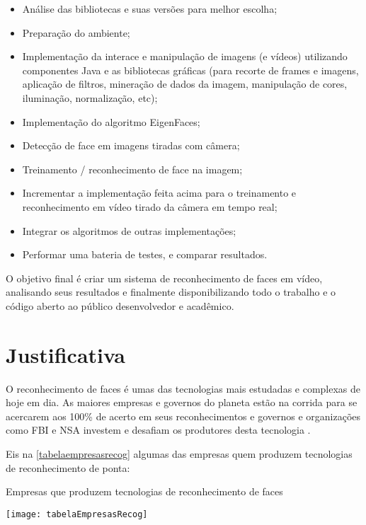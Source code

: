 \begin{itemize}
	\item Análise das bibliotecas e suas versões para melhor escolha;
	\item Preparação do ambiente;
	\item Implementação da interace e manipulação de imagens (e vídeos)  utilizando componentes Java e as bibliotecas gráficas (para  recorte de frames e imagens, aplicação de filtros, mineração de dados da imagem, manipulação de cores, iluminação, normalização, etc);
	\item Implementação do algoritmo EigenFaces;
	\item Detecção de face em imagens tiradas com câmera;
	\item Treinamento / reconhecimento de face na imagem;
	\item Incrementar a implementação feita acima para o treinamento  e reconhecimento em vídeo tirado da câmera em tempo real;
	\item Integrar os algoritmos de outras implementações;
	\item Performar uma bateria de testes, e comparar resultados.
\end{itemize}

O objetivo final é criar um sistema de reconhecimento de faces em vídeo, analisando seus resultados e finalmente disponibilizando todo o trabalho e o código aberto ao público desenvolvedor e acadêmico.


\section{Justificativa} 

O reconhecimento de faces é umas das tecnologias mais estudadas e complexas de hoje em dia. As maiores empresas e governos do planeta estão na corrida para se acercarem aos 100\% de acerto em seus reconhecimentos e governos e organizações como FBI e NSA investem e desafiam os produtores desta tecnologia \cite{nstc_homeland}.

Eis na \autoref{tabelaempresasrecog} algumas das empresas quem produzem tecnologias de reconhecimento de ponta:

\vspace*{5cm}
\begin{table}[h]
	\centering
	\caption{Empresas que produzem tecnologias de reconhecimento de faces}
	\texttt{[image: tabelaEmpresasRecog]}
	\label{tabelaempresasrecog}
\end{table}


